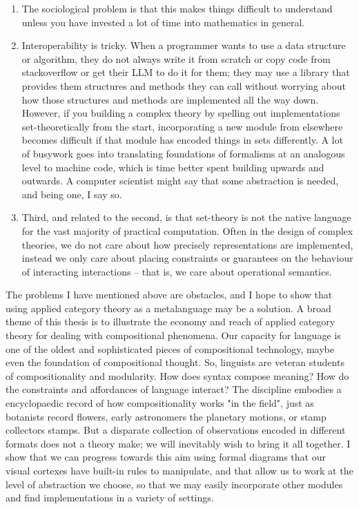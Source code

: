 \begin{enumerate}
\item{
The sociological problem is that this makes things difficult to understand unless you have invested a lot of time into mathematics in general.
}
\item{
Interoperability is tricky. When a programmer wants to use a data structure or algorithm, they do not always write it from scratch or copy code from stackoverflow or get their LLM to do it for them; they may use a library that provides them structures and methods they can call without worrying about how those structures and methods are implemented all the way down. However, if you building a complex theory by spelling out implementations set-theoretically from the start, incorporating a new module from elsewhere becomes difficult if that module has encoded things in sets differently. A lot of busywork goes into translating foundations of formalisms at an analogous level to machine code, which is time better spent building upwards and outwards. A computer scientist might say that some abstraction is needed, and being one, I say so.
}
\item{
Third, and related to the second, is that set-theory is not the native language for the vast majority of practical computation. Often in the design of complex theories, we do not care about how precisely representations are implemented, instead we only care about placing constraints or guarantees on the behaviour of interacting interactions -- that is, we care about operational semantics.
}
\end{enumerate}

The problems I have mentioned above are obstacles, and I hope to show that using applied category theory as a metalanguage may be a solution. A broad theme of this thesis is to illustrate the economy and reach of applied category theory for dealing with compositional phenomena. Our capacity for language is one of the oldest and sophisticated pieces of compositional technology, maybe even the foundation of compositional thought. So, linguists are veteran students of compositionality and modularity. How does syntax compose meaning? How do the constraints and affordances of language interact? The discipline embodies a encyclopaedic record of how compositionality works "in the field", just as botanists record flowers, early astronomers the planetary motions, or stamp collectors stamps. But a disparate collection of observations encoded in different formats does not a theory make; we will inevitably wish to bring it all together. I show that we can progress towards this aim using formal diagrams that our visual cortexes have built-in rules to manipulate, and that allow us to work at the level of abstraction we choose, so that we may easily incorporate other modules and find implementations in a variety of settings.

